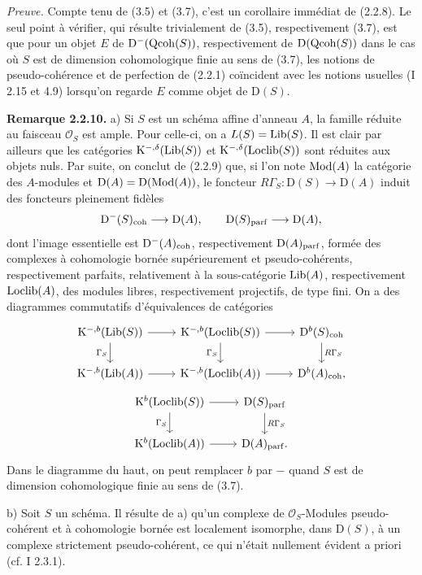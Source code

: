 \documentclass[11pt]{article}
\begin{document}
\emph{Preuve.} Compte tenu de (3.5) et (3.7), c'est un corollaire immédiat de (2.2.8). Le seul point à vérifier, qui résulte trivialement de (3.5), respectivement (3.7), est que pour un objet $E$ de $\mathrm D^{-}(\operatorname{Qcoh}(S))$, respectivement de $\mathrm D(\operatorname{Qcoh}(S))$ dans le cas où $S$ est de dimension cohomologique finie au sens de (3.7), les notions de pseudo-cohérence et de perfection de (2.2.1) coïncident avec les notions usuelles (I 2.15 et 4.9) lorsqu'on regarde $E$ comme objet de $\mathrm D(S)$.

\textbf{Remarque 2.2.10.} a) Si $S$ est un schéma affine d'anneau $A$, la famille réduite au faisceau $\mathcal O_S$ est ample. Pour celle-ci, on a $L(S)=\operatorname{Lib}(S)$. Il est clair par ailleurs que les catégories $\mathrm K^{-,\delta}(\operatorname{Lib}(S))$ et $\mathrm K^{-,\delta}(\operatorname{Loclib}(S))$ sont réduites aux objets nuls. Par suite, on conclut de (2.2.9) que, si l'on note $\operatorname{Mod}(A)$ la catégorie des $A$-modules et $\mathrm D(A)=\mathrm D(\operatorname{Mod}(A))$, le foncteur $R\Gamma_S:\mathrm D(S)\to\mathrm D(A)$ induit des foncteurs pleinement fidèles
\[
\mathrm D^{-}(S)_{\operatorname{coh}}\longrightarrow\mathrm D(A),
\qquad
\mathrm D(S)_{\operatorname{parf}}\longrightarrow\mathrm D(A),
\]
dont l'image essentielle est $\mathrm D^{-}(A)_{\operatorname{coh}}$, respectivement $\mathrm D(A)_{\operatorname{parf}}$, formée des complexes à cohomologie bornée supérieurement et pseudo-cohérents, respectivement parfaits, relativement à la sous-catégorie $\operatorname{Lib}(A)$, respectivement $\operatorname{Loclib}(A)$, des modules libres, respectivement projectifs, de type fini. On a des diagrammes commutatifs d'équivalences de catégories
\[
\begin{tikzcd}
\mathrm K^{-,b}(\Lib(S)) \arrow[r] \arrow[d,"\Gamma_S"'] &
\mathrm K^{-,b}(\Loclib(S)) \arrow[r] \arrow[d,"\Gamma_S"'] &
\mathrm D^b(S)_{\coh} \arrow[d,"R\Gamma_S"] \\
\mathrm K^{-,b}(\Lib(A)) \arrow[r] &
\mathrm K^{-,b}(\Loclib(A)) \arrow[r] &
\mathrm D^b(A)_{\coh},
\end{tikzcd}
\]
\[
\begin{tikzcd}
\mathrm K^b(\Loclib(S)) \arrow[r] \arrow[d,"\Gamma_S"'] &
\mathrm D(S)_{\parf} \arrow[d,"R\Gamma_S"] \\
\mathrm K^b(\Loclib(A)) \arrow[r] &
\mathrm D(A)_{\parf}.
\end{tikzcd}
\]
Dans le diagramme du haut, on peut remplacer $b$ par $-$ quand $S$ est de dimension cohomologique finie au sens de (3.7).

b) Soit $S$ un schéma. Il résulte de a) qu'un complexe de $\mathcal O_S$-Modules pseudo-cohérent et à cohomologie bornée est localement isomorphe, dans $\mathrm D(S)$, à un complexe strictement pseudo-cohérent, ce qui n'était nullement évident a priori (cf. I 2.3.1).
\end{document}
